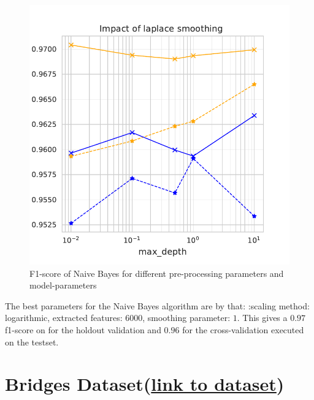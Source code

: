 \documentclass[11pt]{article}
\begin{document}
\begin{figure}
\begin{minipage}[l]{0.3\textwidth}
\end{minipage}
\begin{minipage}[l]{0.3\textwidth}
\includegraphics[width=1\linewidth]{email_spam/nb_smoother.pdf}
\end{minipage}
   \caption{F1-score of Naive Bayes for different pre-processing parameters and model-parameters}
\label{spamfig_fig3}
\end{figure}

The best parameters for the Naive Bayes algorithm are by that: :scaling method: logarithmic, extracted features: $6000$, smoothing parameter: $1$. This gives a $0.97$ f1-score on for the holdout validation and $0.96$ for the cross-validation executed on the testset.



\section{Bridges Dataset(\href{https://archive.ics.uci.edu/ml/datasets/Pittsburgh+Bridges}{link to dataset})}
\end{document}

